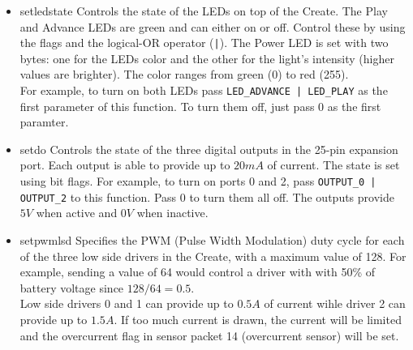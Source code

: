 \documentclass {article}
\begin{document}
\begin {itemize}
\item {} {setledstate} Controls the state of the LEDs on top of
  the Create.  The Play and Advance LEDs are green and can either on
  or off.  Control these by using the \oiled flags and the logical-OR
  operator ({\tt |}).  The Power LED is set with two bytes: one for
  the LEDs color and the other for the light's intensity (higher
  values are brighter).  The color ranges from green
  (0) to red (255). \\
  For example, to turn on both LEDs pass {\tt LED\_ADVANCE |
    LED\_PLAY} as the first parameter
  of this function.  To turn them off, just pass 0 as the first paramter. \\
  \retnorm

\item {} {setdo} Controls
  the state of the three digital outputs in the 25-pin expansion port.
  Each output is able to provide up to $20mA$ of current.  The state
  is set using bit flags.  For example, to turn on ports 0 and 2, pass
  {\tt OUTPUT\_0 | OUTPUT\_2} to this function.  Pass 0 to turn
  them all off. The outputs provide $5V$ when active and $0V$ when inactive. \\
  \retnorm

\item {} {setpwmlsd} Specifies the PWM (Pulse Width Modulation) duty
  cycle for each of the three low side drivers in the Create, with a
  maximum value of 128.  For example, sending a value of 64 would
  control a driver with with 50\% of battery voltage since $128/64 = 0.5$. \\
  Low side drivers 0 and 1 can provide up to $0.5A$ of current wihle
  driver 2 can provide up to $1.5A$.  If too much current is drawn,
  the current will be limited and the overcurrent
  flag in sensor packet 14 (overcurrent sensor) will be set. \\
  \retnorm


\end{itemize}
\end{document}
